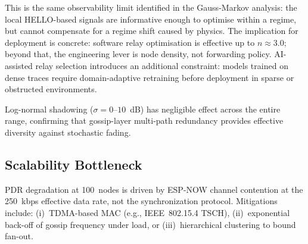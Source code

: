 \documentclass[conference]{IEEEtran}
\begin{document}
This is the same observability limit identified in the Gauss-Markov
analysis: the local HELLO-based signals are informative enough to
optimise within a regime, but cannot compensate for a regime shift caused
by physics.  The implication for deployment is concrete: software relay
optimisation is effective up to $n \approx 3.0$; beyond that, the
engineering lever is node density, not forwarding policy.  AI-assisted
relay selection introduces an additional constraint: models trained on
dense traces require domain-adaptive retraining before deployment in
sparse or obstructed environments.

Log-normal shadowing ($\sigma = 0$--$10$~dB) has negligible effect across
the entire range, confirming that gossip-layer multi-path redundancy
provides effective diversity against stochastic fading.

\subsection{Scalability Bottleneck}
PDR degradation at 100~nodes is driven by ESP-NOW channel contention at the
250~kbps effective data rate, not the synchronization protocol.  Mitigations
include: (i)~TDMA-based MAC (e.g., IEEE~802.15.4 TSCH), (ii)~exponential
back-off of gossip frequency under load, or (iii)~hierarchical clustering to
bound fan-out.
\end{document}
